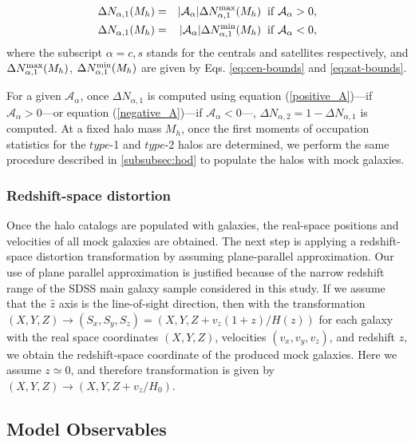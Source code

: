 \documentclass[12pt, preprint]{aastex}
\begin{document}
\begin{eqnarray}
\Delta N_{\alpha , 1}(M_{h}) &=& |\mathcal{A_\alpha}| \Delta N_{\alpha , 1}^{\rm max}(M_{h}) \; \; \rm{if} \; \mathcal{A_\alpha} > 0,  \label{positive_A} \\
\Delta N_{\alpha , 1}(M_{h}) &=& |\mathcal{A_\alpha}| \Delta N_{\alpha , 1}^{\rm min}(M_{h}) \; \; \rm{if} \; \mathcal{A_\alpha} < 0, \label{negative_A}
\end{eqnarray}
where the subscript $\alpha = c , s$ stands for the centrals and satellites respectively, and $\Delta N_{\alpha , 1}^{\rm max}(M_{h})$, $\Delta N_{\alpha , 1}^{\rm min}(M_{h})$ are given by Eqs. \ref{eq:cen-bounds} and \ref{eq:sat-bounds}. 

For a given $\mathcal{A}_{\alpha}$, once $\Delta N_{\alpha,1}$ is computed using equation (\ref{positive_A})---if $\mathcal{A}_{\alpha}>0$---or equation (\ref{negative_A})---if $\mathcal{A}_{\alpha}<0$---, $\Delta N_{\alpha,2} = 1 - \Delta N_{\alpha,1}$ is computed. At a fixed halo mass $M_{h}$, once the first moments of occupation statistics for the $type$-1 and $type$-2 halos are determined, we perform the same procedure described in \ref{subsubsec:hod} to populate the halos with mock galaxies.

\subsubsection{Redshift-space distortion}

Once the halo catalogs are populated with galaxies, the real-space positions and velocities of all mock galaxies are obtained. The next step is applying a redshift-space distortion transformation by assuming plane-parallel approximation.
Our use of plane parallel approximation is justified because of the narrow redshift range of the SDSS main galaxy sample considered in this study.
If we assume that the $\hat{z}$ axis is the line-of-sight direction, then with the transformation $(X,Y,Z) \rightarrow (S_x,S_y,S_z) = (X , Y ,Z + v_{z}(1+z)/H(z))$
for each galaxy with the real space coordinates $(X,Y,Z)$, velocities $(v_x,v_y,v_z)$, and redshift $z$, we obtain the redshift-space coordinate of the produced mock galaxies. Here we assume $z \simeq 0$, and therefore transformation is given by $(X,Y,Z) \rightarrow (X,Y,Z+v_{z}/H_{0})$.   

\subsection{Model Observables}
\end{document}
